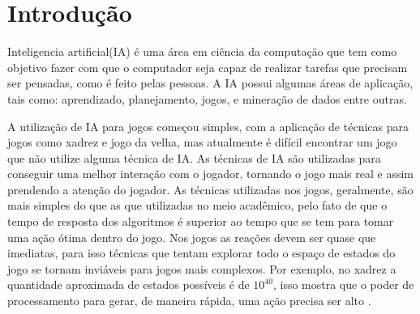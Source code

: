 \chapter{\label{chap:intro}Introdução}



Inteligencia artificial(IA) é uma área em ciência da computação que tem como objetivo fazer com que o computador seja capaz de realizar tarefas que precisam ser pensadas, como é feito pelas pessoas.  
A IA possui algumas áreas de aplicação, tais como: aprendizado, planejamento, jogos, e mineração de dados entre outras. 


A utilização de IA para jogos começou simples, com a aplicação de técnicas para jogos como xadrez e jogo da velha, mas atualmente é difícil encontrar um jogo que não utilize alguma técnica de IA. 
As técnicas de IA são utilizadas para conseguir uma melhor interação com o jogador, tornando o jogo mais real e assim prendendo a atenção do jogador. 
As técnicas utilizadas nos jogos, geralmente, são mais simples do que as que utilizadas no meio acadêmico, pelo fato de que o tempo de resposta dos algoritmos é superior ao tempo que se tem para tomar uma ação ótima dentro do jogo. 
Nos jogos as reações devem ser quase que imediatas, para isso técnicas que tentam explorar todo o espaço de estados do jogo se tornam inviáveis para jogos mais complexos.
Por exemplo, no xadrez a quantidade aproximada de estados possíveis é de $10^{40}$, isso mostra que o poder de processamento para gerar, de maneira rápida, uma ação precisa ser alto \cite{millington2009artificial}. 




